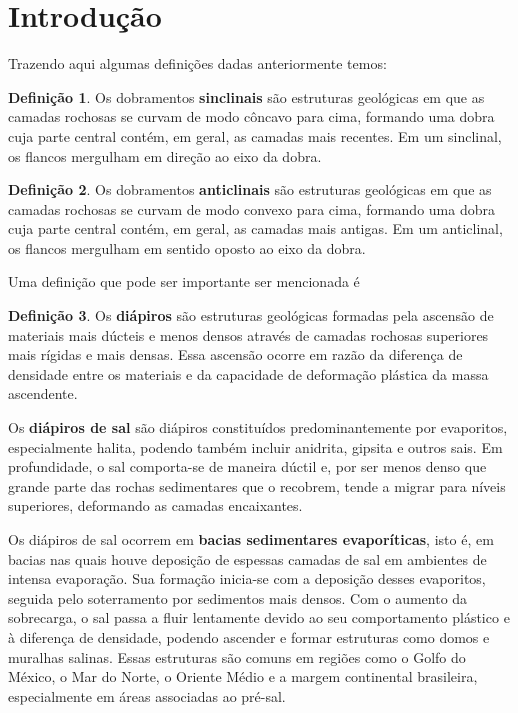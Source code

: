 \documentclass[a4paper,12pt]{article}
\theoremstyle{definition}
\theoremstyle{definition}
\theoremstyle{definition}
\newtheorem{definicao}{Definição}[section]
\begin{document}
\tableofcontents
\newpage

\section{Introdução}

Trazendo aqui algumas definições dadas anteriormente temos:
\begin{definicao}
    
Os dobramentos \textbf{sinclinais} são estruturas geológicas em que as camadas rochosas se curvam de modo côncavo para cima, formando uma dobra cuja parte central contém, em geral, as camadas mais recentes. Em um sinclinal, os flancos mergulham em direção ao eixo da dobra.

\end{definicao}

\begin{definicao}
 Os dobramentos \textbf{anticlinais} são estruturas geológicas em que as camadas rochosas se curvam de modo convexo para cima, formando uma dobra cuja parte central contém, em geral, as camadas mais antigas. Em um anticlinal, os flancos mergulham em sentido oposto ao eixo da dobra.   
\end{definicao}

Uma definição que pode ser importante ser mencionada é 

\begin{definicao}
Os \textbf{diápiros} são estruturas geológicas formadas pela ascensão de materiais mais dúcteis e menos densos através de camadas rochosas superiores mais rígidas e mais densas. Essa ascensão ocorre em razão da diferença de densidade entre os materiais e da capacidade de deformação plástica da massa ascendente.

Os \textbf{diápiros de sal} são diápiros constituídos predominantemente por evaporitos, especialmente halita, podendo também incluir anidrita, gipsita e outros sais. Em profundidade, o sal comporta-se de maneira dúctil e, por ser menos denso que grande parte das rochas sedimentares que o recobrem, tende a migrar para níveis superiores, deformando as camadas encaixantes.

Os diápiros de sal ocorrem em \textbf{bacias sedimentares evaporíticas}, isto é, em bacias nas quais houve deposição de espessas camadas de sal em ambientes de intensa evaporação. Sua formação inicia-se com a deposição desses evaporitos, seguida pelo soterramento por sedimentos mais densos. Com o aumento da sobrecarga, o sal passa a fluir lentamente devido ao seu comportamento plástico e à diferença de densidade, podendo ascender e formar estruturas como domos e muralhas salinas. Essas estruturas são comuns em regiões como o Golfo do México, o Mar do Norte, o Oriente Médio e a margem continental brasileira, especialmente em áreas associadas ao pré-sal.

\end{definicao}
\end{document}

